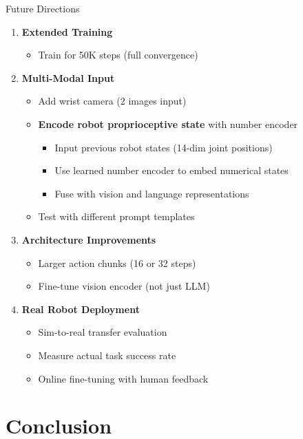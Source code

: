 \documentclass[aspectratio=169]{beamer}
\begin{document}
\begin{frame}{Future Directions}
\begin{enumerate}
    \item \textbf{Extended Training}
    \begin{itemize}
        \item Train for 50K steps (full convergence)
    \end{itemize}
    
    \item \textbf{Multi-Modal Input}
    \begin{itemize}
        \item Add wrist camera (2 images input)
        \item \textbf{Encode robot proprioceptive state} with number encoder
        \begin{itemize}
            \item Input previous robot states (14-dim joint positions)
            \item Use learned number encoder to embed numerical states
            \item Fuse with vision and language representations
        \end{itemize}
        \item Test with different prompt templates
    \end{itemize}
    
    \item \textbf{Architecture Improvements}
    \begin{itemize}
        \item Larger action chunks (16 or 32 steps)
        \item Fine-tune vision encoder (not just LLM)
    \end{itemize}
    
    \item \textbf{Real Robot Deployment}
    \begin{itemize}
        \item Sim-to-real transfer evaluation
        \item Measure actual task success rate
        \item Online fine-tuning with human feedback
    \end{itemize}
\end{enumerate}
\end{frame}

\section{Conclusion}
\end{document}
